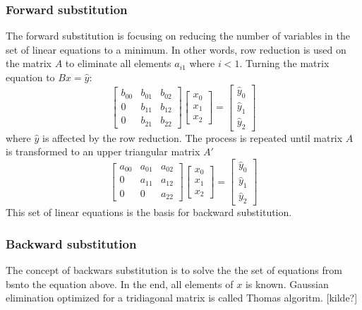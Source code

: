 \documentclass[twoside,twocolumn]{article}
\begin{document}
\subsubsection{Forward substitution}
The forward substitution is focusing on reducing the number of variables in the set of linear equations to a minimum. In other words, row reduction is used on the matrix $A$ to eliminate all elements $a_{i1}$ where $i<1$. Turning the matrix equation to $Bx=\hat{y}$:
\begin{equation}
\begin{bmatrix}
b_{00} & b_{01} & b_{02}\\
0 & b_{11} & b_{12}\\
0 & b_{21} & b_{22}
\end{bmatrix} 
\begin{bmatrix}
x_0 \\ x_1 \\ x_2
\end{bmatrix}=
\begin{bmatrix}
\hat{y}_0 \\ \hat{y}_1 \\ \hat{y}_2
\end{bmatrix}
\end{equation}
where $\hat{y}$ is affected by the row reduction.
The process is repeated until matrix $A$ is transformed to an upper triangular matrix $A'$
\begin{equation}
\begin{bmatrix}
a_{00} & a_{01} & a_{02}\\
0& a_{11} & a_{12}\\
0 & 0 & a_{22}
\end{bmatrix} 
\begin{bmatrix}
x_0 \\ x_1 \\ x_2
\end{bmatrix}=
\begin{bmatrix}
\hat{y}_0 \\ \hat{y}_1 \\ \hat{y}_2
\end{bmatrix}
\end{equation}
This set of linear equations is the basis for backward substitution.
\subsubsection{Backward substitution}
The concept of backwars substitution is to solve the the set of equations from bsnto the equation above. In the end, all elements of $x$ is known. Gaussian elimination optimized for a tridiagonal matrix is called Thomas algoritm. [kilde?]
\end{document}
